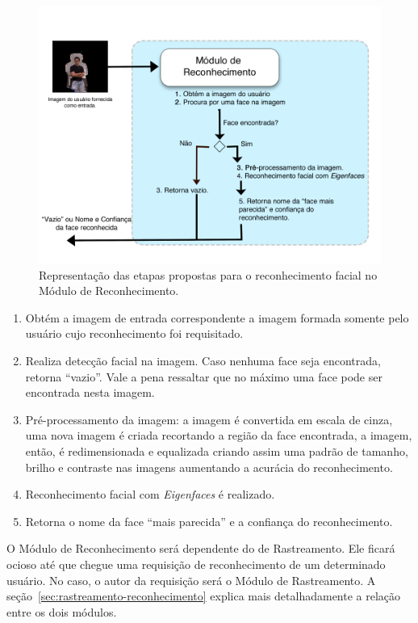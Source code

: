 		\begin{figure}[hbt]
			\begin{center}
				\includegraphics[scale=2.0]{figuras/4.ProblemaEProposta/reconhecimento.png}
			\end{center}
			\caption{Representação das etapas propostas para o reconhecimento facial no Módulo de Reconhecimento.}
			\label{fig:processo-reconhecimento}
		\end{figure}

		\begin{enumerate}
			\item Obtém a imagem de entrada correspondente a imagem formada somente pelo usuário cujo reconhecimento foi requisitado.
			\item Realiza detecção facial na imagem. Caso nenhuma face seja encontrada, retorna ``vazio''. Vale a pena ressaltar que no máximo uma face pode ser encontrada nesta imagem.
			\item Pré-processamento da imagem: a imagem é convertida em escala de cinza, uma nova imagem é criada recortando a região da face encontrada, a imagem, então, é redimensionada e equalizada criando assim uma padrão de tamanho, brilho e contraste nas imagens aumentando a acurácia do reconhecimento.
			\item Reconhecimento facial com \textit{Eigenfaces} é realizado.
			\item Retorna o nome da face ``mais parecida'' e a confiança do reconhecimento.
		\end{enumerate}

	O Módulo de Reconhecimento será dependente do de Rastreamento. Ele ficará ocioso até que chegue uma requisição de reconhecimento de um determinado usuário. No caso, o autor da requisição será o Módulo de Rastreamento. A seção~\ref{sec:rastreamento-reconhecimento} explica mais detalhadamente a relação entre os dois módulos.

